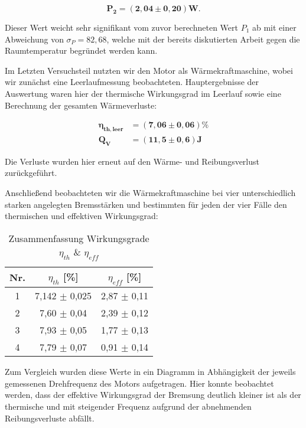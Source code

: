 \documentclass{article}
\begin{document}
\begin{equation}
    \bm{P_2} = \bm{(2,04 \pm 0,20)} \textbf{W}.
\end{equation}

Dieser Wert weicht sehr signifikant vom zuvor berechneten Wert $P_1$ ab mit einer Abweichung von $\sigma_P = 82,68$, welche mit der bereits diskutierten Arbeit gegen die Raumtemperatur begründet werden kann.

Im Letzten Versuchsteil nutzten wir den Motor als Wärmekraftmaschine, wobei wir zunächst eine Leerlaufmessung beobachteten. Hauptergebnisse der Auswertung waren hier der thermische Wirkungsgrad im Leerlauf sowie eine Berechnung der gesamten Wärmeverluste:

\begin{equation}
    \begin{split}
        \bm{\eta_{th,leer}} &= \bm{(7,06 \pm 0,06)} \% \\
        \bm{Q_V} &= \bm{(11,5 \pm 0,6)} \textbf{J}
    \end{split}
\end{equation}

Die Verluste wurden hier erneut auf den Wärme- und Reibungsverlust zurückgeführt. 

Anschließend beobachteten wir die Wärmekraftmaschine bei vier unterschiedlich starken angelegten Bremsstärken und bestimmten für jeden der vier Fälle den thermischen und effektiven Wirkungsgrad:

\begin{table}[!h]
    \centering
    \begin{tabular}{ccc}
        \hline
        \textbf{Nr.} & $\eta_{th}$ [\%] & $\eta_{eff}$ [\%]  \\ \hline
             1 &    7,142 $\pm$     0,025 &      2,87 $\pm$       0,11 \\
             2 &    7,60 $\pm$     0,04 &      2,39  $\pm$       0,12 \\
             3 &    7,93 $\pm$     0,05 &      1,77 $\pm$       0,13 \\
             4 &    7,79 $\pm$     0,07 &      0,91 $\pm$       0,14 \\ \hline
    \end{tabular}
    \caption{Zusammenfassung Wirkungsgrade $\eta_{th}$ \& $\eta_{eff}$}
\end{table}

Zum Vergleich wurden diese Werte in ein Diagramm in Abhängigkeit der jeweils gemessenen Drehfrequenz des Motors aufgetragen. Hier konnte beobachtet werden, dass der effektive Wirkungsgrad der Bremsung deutlich kleiner ist als der thermische und mit steigender Frequenz aufgrund der abnehmenden Reibungsverluste abfällt.
\end{document}
